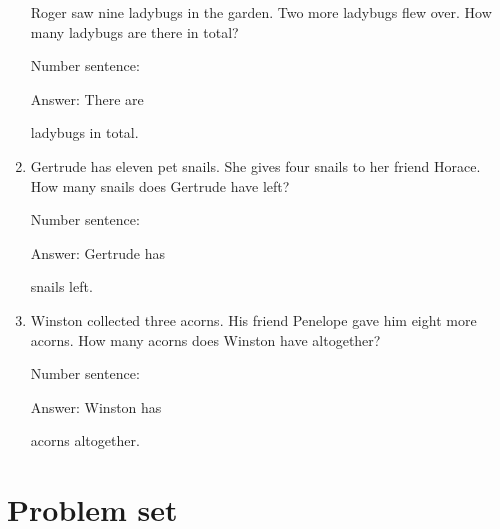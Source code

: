 \documentclass{tufte-book}
\begin{document}
\begin{enumerate}
  Roger saw nine ladybugs in the garden. Two more ladybugs flew over.
  How many ladybugs are there in total?\medskip\par
  Number sentence:
  \dotfill\medskip\par
  Answer: There are
  \dotfill\medskip\par\mbox{}\dotfill\medskip\par\mbox{}\dotfill\bigskip
  ladybugs in total.
\item
  Gertrude has eleven pet snails. She gives four snails to her friend
  Horace. How many snails does Gertrude have left?\medskip\par
  Number sentence:
  \dotfill\medskip\par
  Answer: Gertrude has
  \dotfill\medskip\par\mbox{}\dotfill\medskip\par\mbox{}\dotfill\bigskip
  snails left.
\item
  Winston collected three acorns. His friend Penelope gave him eight
  more acorns. How many acorns does Winston have altogether?\medskip\par
  Number sentence:
  \dotfill\medskip\par
  Answer: Winston has
  \dotfill\medskip\par\mbox{}\dotfill\medskip\par\mbox{}\dotfill\bigskip
  acorns altogether.
\end{enumerate}



\clearpage\section{Problem set }
\end{document}
